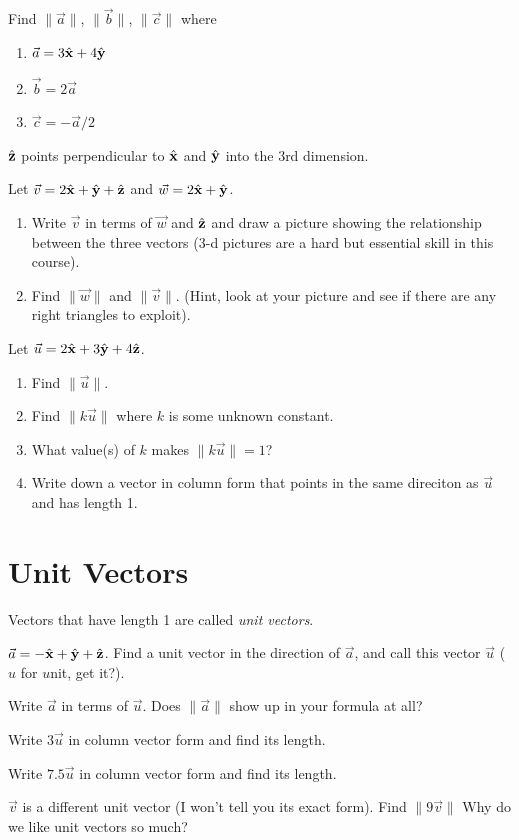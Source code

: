 \documentclass{article}
\newcommand{\xh}{\hat{\bf x}}
\newcommand{\yh}{\hat{\bf y}}
\newcommand{\zh}{\hat{\bf z}}
\begin{document}
	\begin{Enum}
		\item Find $\|\vec a\|$, $\|\vec b\|$, $\|\vec c\|$ where
		\begin{enumerate}
			\item $\vec a=3\xh+4\yh$
			\item $\vec b=2\vec a$
			\item $\vec c = -\vec a/2$
		\end{enumerate}
		\item $\zh$ points perpendicular to $\xh$ and $\yh$ into the 3rd dimension.
		
		Let $\vec v=2\xh+\yh+\zh$ and $\vec w=2\xh+\yh$.
		\begin{enumerate}
			\item Write $\vec v$ in terms of $\vec w$ and $\zh$
			and draw a picture showing the relationship between the three vectors
			(3-d pictures are a hard but essential skill in this course).
			\item Find $\|\vec w\|$ and $\|\vec v\|$.  (Hint, look at your picture
			and see if there are any right triangles to exploit).
		\end{enumerate}
		\item Let $\vec u=2\xh+3\yh+4\zh$.
		\begin{enumerate}
			\item Find $\|\vec u\|$.
			\item Find $\|k\vec u\|$ where $k$ is some unknown constant.
			\item What value(s) of $k$ makes $\|k\vec u\|=1$?
			\item Write down a vector in column form that points in the same direciton
			as $\vec u$ and has length 1.
		\end{enumerate}
	\end{Enum}

\section*{Unit Vectors}
	Vectors that have length 1 are called \emph{unit vectors}.
	\begin{Enum}
		\item $\vec a=-\xh+\yh+\zh$.  Find a unit vector in the direction of $\vec a$,
		and call this vector $\vec u$ ($u$ for $u$nit, get it?).
		\item Write $\vec a$ in terms of $\vec u$.  Does $\|\vec a\|$ show up in your formula at all?
		\item Write $3\vec u$ in column vector form and find its length.
		\item Write $7.5\vec u$ in column vector form and find its length.
		\item $\vec v$ is a different unit vector (I won't tell you its exact form).  Find $\|9\vec v\|$
		Why do we like unit vectors so much?
	\end{Enum}
\end{document}

